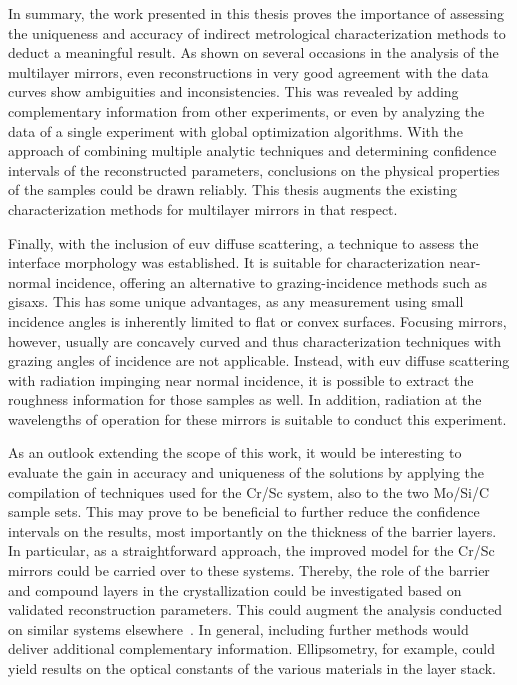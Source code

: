 In summary, the work presented in this thesis proves the importance of assessing
the uniqueness and accuracy of indirect metrological characterization methods to
deduct a meaningful result.
As shown on several occasions in the analysis of the multilayer mirrors, even
reconstructions in very good agreement with the data curves show ambiguities and
inconsistencies.
This was revealed by adding complementary information from other experiments, or
even by analyzing the data of a single experiment with global optimization
algorithms.
With the approach of combining multiple analytic techniques and determining
confidence intervals of the reconstructed parameters, conclusions on the
physical properties of the samples could be drawn reliably.
This thesis augments the existing characterization methods for multilayer
mirrors in that respect.

Finally, with the inclusion of \gls{euv} diffuse scattering, a technique to
assess the interface morphology was established.
It is suitable for characterization near-normal incidence, offering an
alternative to grazing-incidence methods such as \gls{gisaxs}.
This has some unique advantages, as any measurement using small incidence angles
is inherently limited to flat or convex surfaces.
Focusing mirrors, however, usually are concavely curved and thus
characterization techniques with grazing angles of incidence are not applicable.
Instead, with \gls{euv} diffuse scattering with radiation impinging near normal
incidence, it is possible to extract the roughness information for those samples
as well.
In addition, radiation at the wavelengths of operation for these mirrors is
suitable to conduct this experiment.

As an outlook extending the scope of this work, it would be interesting to
evaluate the gain in accuracy and uniqueness of the solutions by applying the
compilation of techniques used for the Cr/Sc system, also to the two Mo/Si/C
sample sets.
This may prove to be beneficial to further reduce the confidence intervals on
the results, most importantly on the thickness of the barrier layers.
In particular, as a straightforward approach, the improved model for the Cr/Sc
mirrors could be carried over to these systems.
Thereby, the role of the barrier and compound layers in the crystallization
could be investigated based on validated reconstruction parameters.
This could augment the analysis conducted on similar systems
elsewhere~\cite{bajt_investigation_2001}.
In general, including further methods would deliver additional complementary
information.
Ellipsometry, for example, could yield results on the optical constants of the
various materials in the layer stack.
